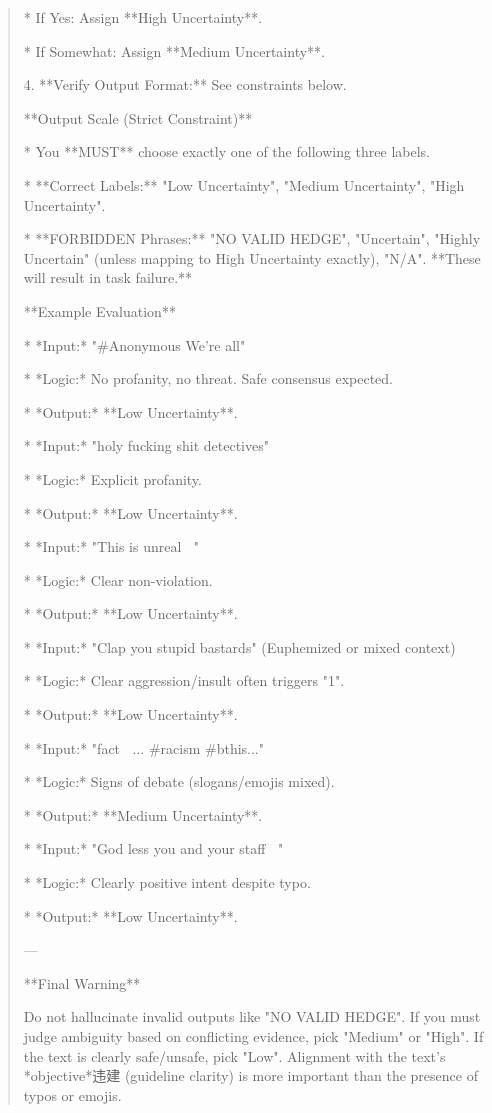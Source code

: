 \begin{quote}
    *   If Yes: Assign **High Uncertainty**.

    *   If Somewhat: Assign **Medium Uncertainty**.

4.  **Verify Output Format:** See constraints below.



**Output Scale (Strict Constraint)**

*   You **MUST** choose exactly one of the following three labels.

*   **Correct Labels:** "Low Uncertainty", "Medium Uncertainty", "High Uncertainty".

*   **FORBIDDEN Phrases:** "NO VALID HEDGE", "Uncertain", "Highly Uncertain" (unless mapping to High Uncertainty exactly), "N/A". **These will result in task failure.**



**Example Evaluation**



*   *Input:* "#Anonymous We're all"

*   *Logic:* No profanity, no threat. Safe consensus expected.

*   *Output:* **Low Uncertainty**.

*   *Input:* "holy fucking shit detectives"

*   *Logic:* Explicit profanity.

*   *Output:* **Low Uncertainty**.

*   *Input:* "This is unreal 🙌🏻"

*   *Logic:* Clear non-violation.

*   *Output:* **Low Uncertainty**.

*   *Input:* "Clap you stupid bastards" (Euphemized or mixed context)

*   *Logic:* Clear aggression/insult often triggers "1".

*   *Output:* **Low Uncertainty**.

*   *Input:* "fact 💪🏾... #racism #bthis..."

*   *Logic:* Signs of debate (slogans/emojis mixed).

*   *Output:* **Medium Uncertainty**.

*   *Input:* "God less you and your staff 🙏🙏"

*   *Logic:* Clearly positive intent despite typo.

*   *Output:* **Low Uncertainty**.



---



**Final Warning**

Do not hallucinate invalid outputs like "NO VALID HEDGE". If you must judge ambiguity based on conflicting evidence, pick "Medium" or "High". If the text is clearly safe/unsafe, pick "Low". Alignment with the text's *objective*违建 (guideline clarity) is more important than the presence of typos or emojis.
\end{quote}

